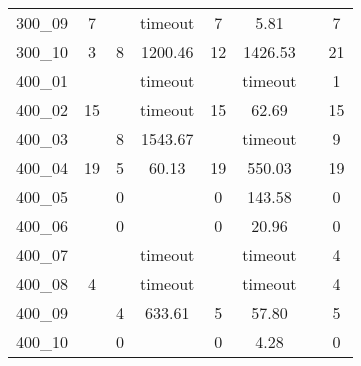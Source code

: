 \begin{tabular}{ l|c|cc|cc|cc  }
300\_09	&7	&	& timeout &7	&5.81	&	&7	\\
300\_10	&3	&8	&1200.46	&12	&1426.53	&	&21	\\
400\_01	&	&	& timeout   &	& timeout  &	&1	\\
400\_02	&15	&	& timeout  &15	&62.69	&	&15	\\
400\_03	&	&8	&1543.67	&	& timeout  &	&9	\\
400\_04	&19	&5	&60.13	&19	&550.03	&	&19	\\
400\_05	&	&0	&	&0	&143.58	&	&0	\\
400\_06	&	&0	&	&0	&20.96	&	&0	\\
400\_07	&	&	& timeout  &	& timeout  &	&4	\\
400\_08	&4	&	& timeout  &	& timeout  &	&4	\\
400\_09	&	&4	&633.61	&5	&57.80	&	&5	\\
400\_10	&	&0	&	&0	&4.28	&	&0	\\
\hline                        
\end{tabular}
